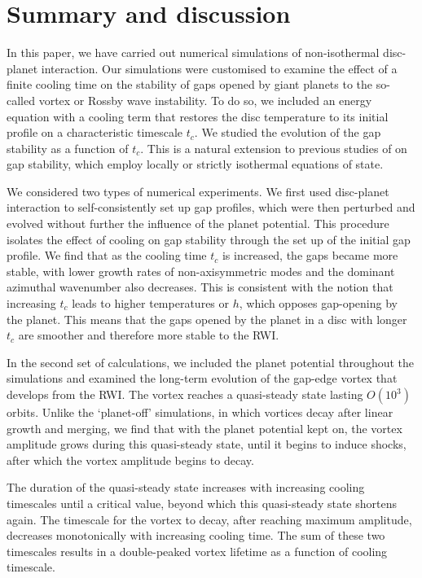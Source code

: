 \section{Summary and discussion}\label{summary}
In this paper, we have carried out numerical simulations of
non-isothermal disc-planet interaction.  
Our simulations were customised to examine the effect of a finite 
cooling time on the stability of gaps  
opened by giant planets to the so-called vortex or Rossby wave
instability. To do so, we  
included an energy equation with a cooling term that restores the 
disc temperature to its initial profile on a characteristic timescale
$t_c$. We studied the evolution of the gap stability as a function of 
$t_c$. This is a natural extension to previous studies of on gap
stability, which employ locally or strictly isothermal equations of
state.   	

We considered two types of numerical experiments. We first used
disc-planet interaction to self-consistently set up gap profiles,
which were then perturbed and evolved without further the influence of
the planet potential. This procedure isolates the effect of cooling on
gap stability through the set up of the initial gap profile. We find
that as the cooling time $t_c$ is increased, the gaps became more
stable, with lower growth rates of non-axisymmetric modes and the
dominant azimuthal wavenumber also decreases. This is consistent with
the notion that increasing $t_c$ leads to higher temperatures or $h$,
which opposes gap-opening by the planet. This means that the gaps
opened by the planet in a disc with longer $t_c$ are smoother and
therefore  more stable to the RWI. %


In the second set of calculations, we included the planet potential
throughout the simulations  and examined the long-term evolution of
the gap-edge vortex that develops from the RWI. The vortex reaches 
a quasi-steady state lasting $O(10^3)$ orbits. Unlike the `planet-off'
simulations, in which vortices decay after linear growth and merging,
we find that with the planet potential kept on, the vortex amplitude
grows during this quasi-steady state, until it begins to induce
shocks, after which the vortex amplitude begins to decay.   

The duration of the quasi-steady state increases with
increasing cooling timescales until a critical value, beyond which this
quasi-steady state shortens again. The timescale for the vortex to
decay, after reaching maximum amplitude, decreases monotonically with
increasing cooling time. The sum of these two timescales results in a
double-peaked vortex lifetime as a function of cooling
timescale. 

